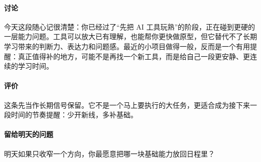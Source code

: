 \documentclass[UTF8,zihao=-4]{ctexart}
\begin{document}
\paragraph{讨论} 今天这段随心记很清楚：你已经过了“先把 AI 工具玩熟”的阶段，正在碰到更硬的一层能力问题。工具可以放大已有理解，也能帮你更快做原型，但它替代不了长期学习带来的判断力、表达力和问题感。最近的小项目做得一般，反而是一个有用提醒：真正值得补的地方，可能不是再找一个新工具，而是给自己一段更安静、更连续的学习时间。
\paragraph{评价} 这条先当作长期信号保留。它不是一个马上要执行的大任务，更适合成为接下来一段时间的节奏提醒：少开新线，多补基础。
\paragraph{留给明天的问题} 明天如果只收窄一个方向，你最愿意把哪一块基础能力放回日程里？
\end{document}
